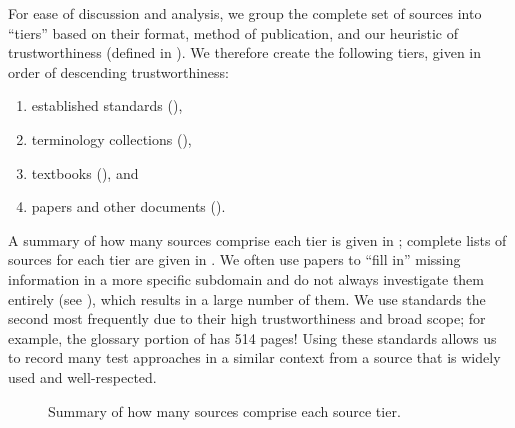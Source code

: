 For ease of discussion and analysis, we group the complete set of sources into
``tiers'' based on their format, method of publication, and our heuristic of
trustworthiness (defined in ). We therefore create the
following tiers, given in order of descending trustworthiness:
\begin{enumerate}
    \item established standards (),
    \item terminology collections (),
    \item textbooks (), and
    \item papers and other documents ().
\end{enumerate}
A summary of how many sources comprise each tier is given in
\ifnotpaper; complete lists of sources for each tier
are given in \fi. We often use papers to ``fill in'' missing
information in a more specific subdomain and do not always investigate them
entirely (see ), which results in a large number of them. We
use standards the second most frequently due to their high trustworthiness and
broad scope; for example, the glossary portion of \citep{IEEE2017} has 514
pages! Using these standards allows us to record many test approaches in a
similar context from a source that is widely used and well-respected.

\begin{figure}[bt!]
    \centering
    \caption{Summary of how many sources comprise each source tier.}
    \label{fig:sourceSummary}
\end{figure}

\subsubsection{}
\label{stds}

